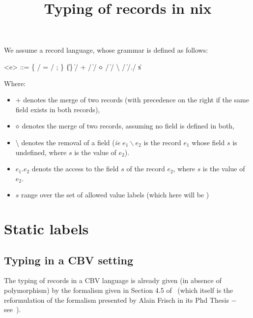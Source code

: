 

\title{Typing of records in nix}



\maketitle{}

We assume a record language, whose grammar is defined as follows:

\begin{grammar}
  <e> ::= \{ \e/ = \e/ ; \} \| \{\}
    \| \e/ + \e/
    \| \e/ $\diamond{}$ \e/
    \| \e/ \textbackslash{} \e/
    \| \e/.\e/
    \| s
\end{grammar}

Where:
\begin{itemize}
  \item $+$ denotes the merge of two records (with precedence on the right if
    the same field exists in both records),
  \item $\diamond{}$ denotes the merge of two records, assuming no field is
    defined in both,
  \item \textbackslash{} denotes the removal of a field (\emph{ie} $e_1
    \backslash e_2$ is the record $e_1$ whose field $s$ is undefined, where $s$
    is the value of $e_2$).
  \item $e_1.e_2$ denots the access to the field $s$ of the record $e_2$,
    where $s$ is the value of $e_2$.
  \item $s$ range over the set of allowed value labels (which here will be )
\end{itemize}

\section{Static labels}
\subsection{Typing in a CBV setting}
The typing of records in a CBV language is already given (in absence of
polymorphism) by the formalism given in Section 4.5 of~\cite{Cas15} (which itself
is the reformulation of the formalism presented by Alain Frisch in its Phd
Thesis − see~\cite{Fri04}).

